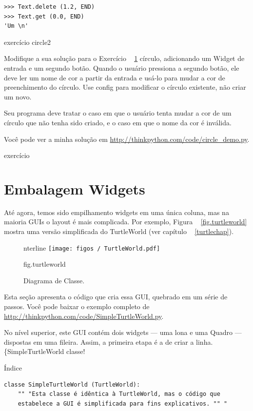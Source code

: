 \documentclass[10pt]{book}
\begin{document}
\begin{v erbatim}
{\begin{verbatim}
>>> Text.delete (1.2, END)
>>> Text.get (0.0, END)
'Um \n'
\end{verbatim}
%

\begin{} exercício
\label{} circle2

Modifique a sua solução para o Exercício ~ \ref {} círculo, adicionando um
Widget de entrada e um segundo botão. Quando o usuário pressiona a
segundo botão, ele deve ler um nome de cor a partir da entrada e
usá-lo para mudar a cor de preenchimento do círculo. Use {config \tt}
para modificar o círculo existente, não criar um novo.

Seu programa deve tratar o caso em que o usuário tenta
mudar a cor de um círculo que não tenha sido criado, e
o caso em que o nome da cor é inválida.

Você pode ver a minha solução em \url{http://thinkpython.com/code/circle_demo.py}.

\end{} exercício


\section{Embalagem Widgets}

Até agora, temos sido empilhamento widgets em uma única coluna, mas na maioria
GUIs o layout é mais complicada. Por exemplo,
Figura ~ \ref {fig.turtleworld} mostra uma versão simplificada do
TurtleWorld (ver capítulo ~ \ref {turtlechap}).

\begin{figure}
\Ce nterline {\texttt{[image: figos / TurtleWorld.pdf]}}
\caption{Diagrama de Classe.}
\label{} fig.turtleworld
\end{figure}


Esta seção apresenta o código que cria essa GUI, quebrado em um
série de passos. Você pode baixar o exemplo completo
de \url{http://thinkpython.com/code/SimpleTurtleWorld.py}.

No nível superior, este GUI contém dois widgets --- uma lona e uma
Quadro --- dispostas em uma fileira. Assim, a primeira etapa é a de criar a linha.
\{SimpleTurtleWorld classe!} Índice

\begin{verbatim}
classe SimpleTurtleWorld (TurtleWorld):
    "" "Esta classe é idêntica à TurtleWorld, mas o código que
    estabelece a GUI é simplificada para fins explicativos. "" "


\end{verbatim}
\end{v erbatim}
\end{document}
